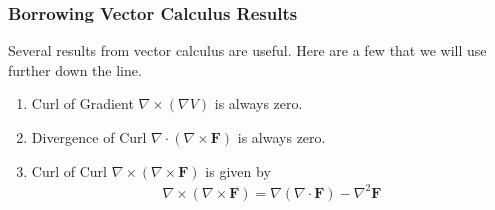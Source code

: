 \subsubsection{Borrowing Vector Calculus Results}

Several results from vector calculus are useful. Here are
a few that we will use further down the line.
\begin{enumerate}
  \item Curl of Gradient \(\nabla \times (\nabla V)\) is always zero.
  \item Divergence of Curl \(\nabla \cdot (\nabla \times \mathbf{F})\) is always zero.
  \item Curl of Curl \(\nabla \times (\nabla \times \mathbf{F})\) is given by
    \begin{align*}
      \nabla \times (\nabla \times \mathbf{F}) = \nabla (\nabla \cdot \mathbf{F}) - \nabla^2 \mathbf{F}
    \end{align*}
\end{enumerate}
